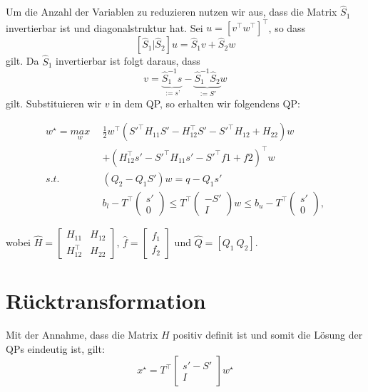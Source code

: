 Um die Anzahl der Variablen zu reduzieren nutzen wir aus, dass die Matrix $\hat{S}_1$ invertierbar ist und diagonalstruktur hat. Sei $u=[v^\top w^\top]^\top$, so dass $$\left[\hat{S}_1 \vert \hat{S}_2 \right]u=\hat{S}_1v+\hat{S}_2w$$ gilt. Da $\hat{S}_1$ invertierbar ist folgt daraus, dass $$v=\underbrace{\hat{S}^{-1}_1s}_{:=s’}-\underbrace{\hat{S}^{-1}_1\hat{S}_2}_{:=S'} w$$ gilt. Substituieren wir $v$ in dem QP, so erhalten wir folgendens QP:

\begin{align*}
w^\star=\underset{w}{max} \ \ 	& \frac{1}{2}	w^\top \left(S'^\top H_{11}S'-H_{12}^\top S'-S'^\top H_{12}+H_{22}\right) w \\
						&+\left(H_{12}^\top s'-S'^\top H_{11}s'-S'^\top f1+f2\right)^\top w \\
s.t. \ \					& \left(Q_2-Q_1S' \right)w =q-Q_1s' \\
						& b_l-T^\top \left( \begin{array}{c} s' \\ 0	\end{array}\right)  						\leq T^\top \left( \begin{array}{c} -S' \\ I	\end{array}	 \right)w
						\leq b_u-T^\top \left( \begin{array}{c} s' \\ 0	\end{array}	\right), 
\end{align*}

wobei $\hat{H}=\left[ \begin{array}{cc} H_{11}&H_{12}\\ H_{12}^\top & H_{22}\end{array} \right]$, $\hat{f}=\left[ \begin{array}{c} f_1 \\ f_2\end{array} \right]$ und $\hat{Q}= [Q_1 \ Q_2]$.

\section{Rücktransformation}

Mit der Annahme, dass die Matrix $H$ positiv definit ist und somit die Lösung der QPs eindeutig ist, gilt: $$x^\star=T^\top \left[\begin{array}{c} s'-S' \\ I \end{array}\right] w^\star$$




















